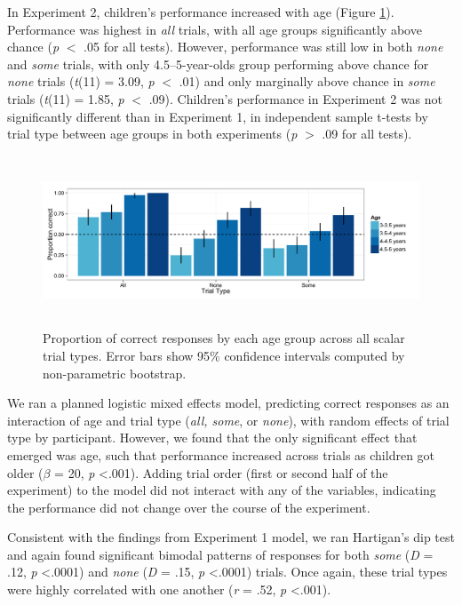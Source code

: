 \documentclass[man]{apa2}
\begin{document}
In Experiment 2, children's performance increased with age (Figure \ref{fig:exp2_perf}). Performance was highest in \textit{all} trials, with all age groups significantly above chance (\emph{p} $<$ .05 for all tests). However, performance was still low in both \textit{none} and \textit{some} trials, with only 4.5--5-year-olds group performing above chance for \textit{none} trials (\textit{t}(11) = 3.09, \textit{p} $<$ .01) and only marginally above chance in \textit{some} trials (\textit{t}(11) = 1.85, \textit{p} $<$ .09). Children's performance in Experiment 2 was not significantly different than in Experiment 1, in independent sample t-tests by trial type between age groups in both experiments (\emph{p} $>$ .09 for all tests). 

\begin{figure} [h]
 \begin{center} 
  \includegraphics[height=2in]{figures/exp2_performance.pdf} 
  \caption{\label{fig:exp2_perf} Proportion of correct responses by each age group across all scalar trial types.  Error bars show 95\% confidence intervals computed by non-parametric bootstrap.} 
 \end{center} 
\end{figure}


We ran a planned logistic mixed effects model, predicting correct responses as an interaction of age and trial type (\textit{all, some}, or \textit{none}), with random effects of trial type by participant. However, we found that the only significant effect that emerged was age, such that performance increased across trials as children got older ($\beta$ = 20, \textit{p} \textless  .001). Adding trial order (first or second half of the experiment) to the model did not interact with any of the variables, indicating the performance did not change over the course of the experiment. 

Consistent with the findings from Experiment 1 model, we  ran Hartigan's dip test and again found significant bimodal patterns of responses for both \textit{some} (\textit{D} = .12, \textit{p} \textless  .0001) and \textit{none} (\textit{D} = .15, \textit{p} \textless  .0001) trials. Once again, these trial types were highly correlated with one another (\textit{r} = .52, \textit{p} \textless  .001). 
\end{document}
